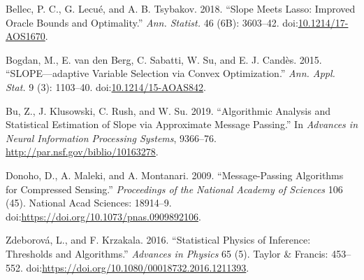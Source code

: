 \documentclass[]{article}
\begin{document}
\hypertarget{ref-MR3852663}{}
Bellec, P. C., G. Lecué, and A. B. Tsybakov. 2018. ``Slope Meets Lasso:
Improved Oracle Bounds and Optimality.'' \emph{Ann. Statist.} 46 (6B):
3603--42.
doi:\href{https://doi.org/10.1214/17-AOS1670}{10.1214/17-AOS1670}.

\hypertarget{ref-MR3418717}{}
Bogdan, M., E. van den Berg, C. Sabatti, W. Su, and E. J. Candès. 2015.
``SLOPE---adaptive Variable Selection via Convex Optimization.''
\emph{Ann. Appl. Stat.} 9 (3): 1103--40.
doi:\href{https://doi.org/10.1214/15-AOAS842}{10.1214/15-AOAS842}.

\hypertarget{ref-bu2019algorithmic}{}
Bu, Z., J. Klusowski, C. Rush, and W. Su. 2019. ``Algorithmic Analysis
and Statistical Estimation of Slope via Approximate Message Passing.''
In \emph{Advances in Neural Information Processing Systems}, 9366--76.
\url{http://par.nsf.gov/biblio/10163278}.

\hypertarget{ref-donoho2009message}{}
Donoho, D., A. Maleki, and A. Montanari. 2009. ``Message-Passing
Algorithms for Compressed Sensing.'' \emph{Proceedings of the National
Academy of Sciences} 106 (45). National Acad Sciences: 18914--9.
doi:\href{https://doi.org/https://doi.org/10.1073/pnas.0909892106}{https://doi.org/10.1073/pnas.0909892106}.

\hypertarget{ref-zdeborova2016statistical}{}
Zdeborová, L., and F. Krzakala. 2016. ``Statistical Physics of
Inference: Thresholds and Algorithms.'' \emph{Advances in Physics} 65
(5). Taylor \& Francis: 453--552.
doi:\href{https://doi.org/https://doi.org/10.1080/00018732.2016.1211393}{https://doi.org/10.1080/00018732.2016.1211393}.
\end{document}
